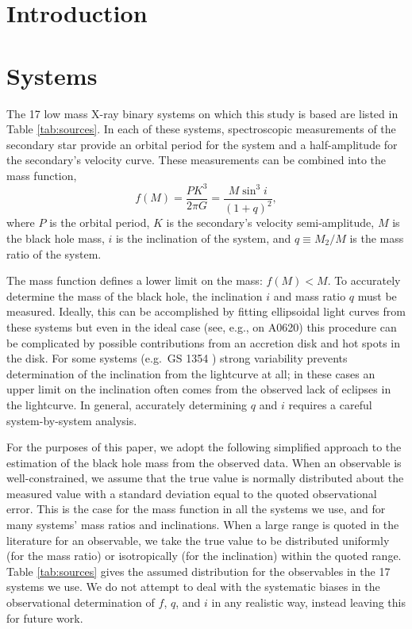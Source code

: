 \documentclass[preprint]{aastex}
\begin{document}
\section{Introduction}
\label{sec:intro}

\section{Systems}
\label{sec:systems}

The 17 low mass X-ray binary systems on which this study is based are
listed in Table \ref{tab:sources}.  In each of these systems,
spectroscopic measurements of the secondary star provide an orbital
period for the system and a half-amplitude for the secondary's
velocity curve.  These measurements can be combined into the mass
function,
\begin{equation}
  \label{eq:mass-function}
  f(M) = \frac{P K^3}{2\pi G} = \frac{M \sin^3 i}{\left( 1 + q \right)^2},
\end{equation}
where $P$ is the orbital period, $K$ is the secondary's velocity
semi-amplitude, $M$ is the black hole mass, $i$ is the inclination of
the system, and $q \equiv M_2 / M$ is the mass ratio of the system.

The mass function defines a lower limit on the mass: $f(M) < M$.  To
accurately determine the mass of the black hole, the inclination $i$
and mass ratio $q$ must be measured.  Ideally, this can be
accomplished by fitting ellipsoidal light curves from these systems
but even in the ideal case (see, e.g., \citet{Cantrell2010} on A0620)
this procedure can be complicated by possible contributions from an
accretion disk and hot spots in the disk.  For some systems (e.g.\ GS
1354 \citep{Casares2009}) strong variability prevents determination of
the inclination from the lightcurve at all; in these cases an upper
limit on the inclination often comes from the observed lack of
eclipses in the lightcurve.  In general, accurately determining $q$
and $i$ requires a careful system-by-system analysis.

For the purposes of this paper, we adopt the following simplified
approach to the estimation of the black hole mass from the observed
data.  When an observable is well-constrained, we assume that the true
value is normally distributed about the measured value with a standard
deviation equal to the quoted observational error.  This is the case
for the mass function in all the systems we use, and for many systems'
mass ratios and inclinations.  When a large range is quoted in the
literature for an observable, we take the true value to be distributed
uniformly (for the mass ratio) or isotropically (for the inclination)
within the quoted range.  Table \ref{tab:sources} gives the assumed
distribution for the observables in the 17 systems we use.  We do not
attempt to deal with the systematic biases in the observational
determination of $f$, $q$, and $i$ in any realistic way, instead
leaving this for future work.
\end{document}
